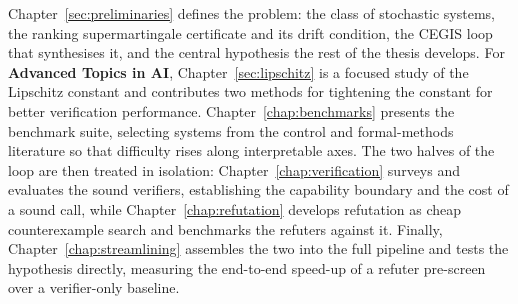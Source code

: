 Chapter~\ref{sec:preliminaries} defines the problem: the class of stochastic
systems, the ranking supermartingale certificate and its drift condition, the
CEGIS loop that synthesises it, and the central hypothesis the rest of the thesis
develops. For \textbf{Advanced Topics in AI}, Chapter~\ref{sec:lipschitz} is a focused study of the Lipschitz
constant and contributes two methods for tightening the constant for better verification performance. Chapter~\ref{chap:benchmarks} presents the benchmark suite, selecting
systems from the control and formal-methods literature so that difficulty rises
along interpretable axes. The two halves of the loop are then treated in
isolation: Chapter~\ref{chap:verification} surveys and evaluates the sound
verifiers, establishing the capability boundary and the cost of a sound call,
while Chapter~\ref{chap:refutation} develops refutation as cheap counterexample
search and benchmarks the refuters against it. Finally,
Chapter~\ref{chap:streamlining} assembles the two into the full pipeline and
tests the hypothesis directly, measuring the end-to-end speed-up of a refuter
pre-screen over a verifier-only baseline.


\newpage
